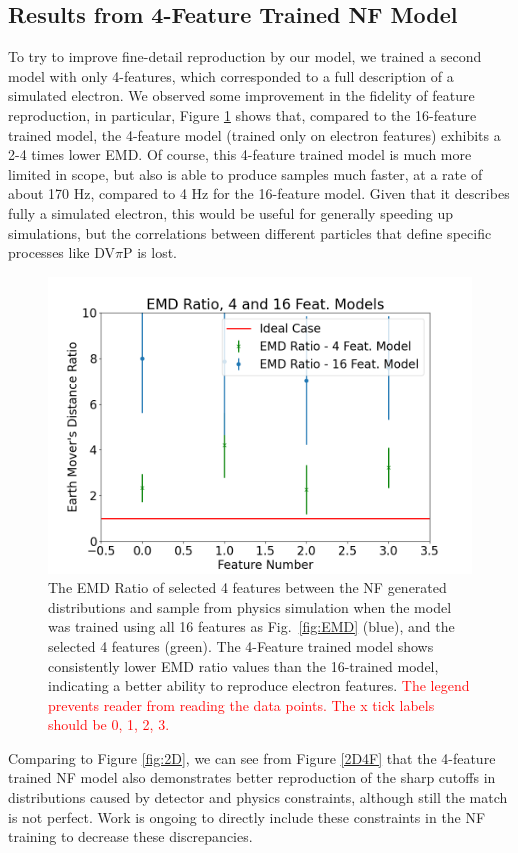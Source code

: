 \subsection{Results from 4-Feature Trained NF Model}

To try to improve fine-detail reproduction by our model, we trained a second model with only 4-features, which corresponded to a full description of a simulated electron. We observed some improvement in the fidelity of feature reproduction, in particular, Figure \ref{fig:EMD2} shows that, compared to the 16-feature trained model, the 4-feature model (trained only on electron features) exhibits a 2-4 times lower EMD. Of course, this 4-feature trained model is much more limited in scope, but also is able to produce samples much faster, at a rate of about 170 Hz, compared to 4 Hz for the 16-feature model. Given that it describes fully a simulated electron, this would be useful for generally speeding up simulations, but the correlations between different particles that define specific processes like DV$\pi$P is lost. 


\begin{figure}[!ht]
    \centering
    \includegraphics[width=.47\textwidth,trim={ 0 0 0 0},clip]{Chapters/Ch3-Simulations/normalizing_flows/pics/FinalPictures/EMD/emdratio416.png}
    \caption{The EMD Ratio of selected 4 features between the NF generated distributions and sample from physics simulation when the model was trained using all 16 features as Fig.~\ref{fig:EMD} (blue), and the selected 4 features (green). The 4-Feature trained model shows consistently lower EMD ratio values than the 16-trained model, indicating a better ability to reproduce electron features. \textcolor{red}{The legend prevents reader from reading the data points. The x tick labels should be 0, 1, 2, 3.}}
    \label{fig:EMD2}
\end{figure}

Comparing to Figure \ref{fig:2D}, we can see from Figure \ref{2D4F} that the 4-feature trained NF model also demonstrates better reproduction of the sharp cutoffs in distributions caused by detector and physics constraints, although still the match is not perfect. Work is ongoing to directly include these constraints in the NF training to decrease these discrepancies.

